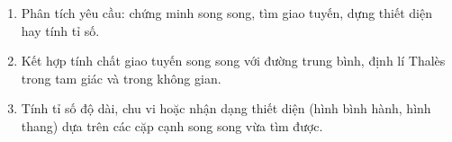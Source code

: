 \begin{enumerate}
\item Phân tích yêu cầu: chứng minh song song, tìm giao tuyến, dựng thiết diện hay tính tỉ số.
\item Kết hợp tính chất giao tuyến song song với đường trung bình, định lí Thalès trong tam giác và trong không gian.
\item Tính tỉ số độ dài, chu vi hoặc nhận dạng thiết diện (hình bình hành, hình thang) dựa trên các cặp cạnh song song vừa tìm được.
\end{enumerate}
